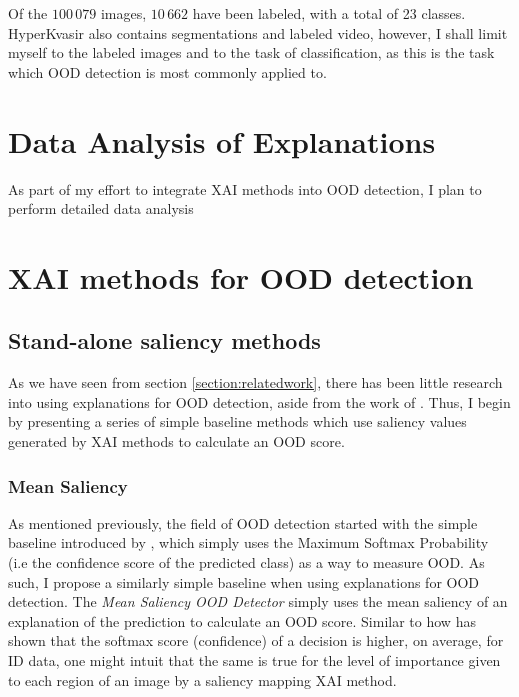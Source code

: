 \documentclass[UKenglish]{uiomasterthesis} %
\theoremstyle{definition}
\begin{document}
Of the $100 \, 079$ images, $10 \, 662$ have been labeled, with a total of 23 classes. HyperKvasir also contains segmentations and labeled video, however, I shall limit myself to the labeled images and to the task of classification, as this is the task which OOD detection is most commonly applied to.

\section{Data Analysis of Explanations}

As part of my effort to integrate XAI methods into OOD detection, I plan to perform detailed data analysis

\section{XAI methods for OOD detection}

\subsection{Stand-alone saliency methods}

As we have seen from section \ref{section:relatedwork}, there has been little research into using explanations for OOD detection, aside from the work of \cite{martinez}. Thus, I begin by presenting a series of simple baseline methods which use saliency values generated by XAI methods to calculate an OOD score.


\subsubsection{Mean Saliency}

As mentioned previously, the field of OOD detection started with the simple baseline introduced by \cite{oodbaseline}, which simply uses the Maximum Softmax Probability (i.e the confidence score of the predicted class) as a way to measure OOD. As such, I propose a similarly simple baseline when using explanations for OOD detection. The {\it Mean Saliency OOD Detector} simply uses the mean saliency of an explanation of the prediction to calculate an OOD score. Similar to how \cite{oodbaseline} has shown that the softmax score (confidence) of a decision is higher, on average, for ID data, one might intuit that the same is true for the level of importance given to each region of an image by a saliency mapping XAI method.
\end{document}
